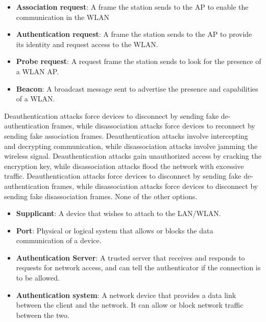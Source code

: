 \begin{solution}
    \begin{itemize}
        \item \textbf{Association request}: A frame the station sends to the AP to enable the communication in the WLAN
        \item \textbf{Authentication request}: A frame the station sends to the AP to provide its identity and request access to the WLAN.
        \item \textbf{Probe request}: A request frame the station sends to look for the presence of a WLAN AP.
        \item \textbf{Beacon}: A broadcast message sent to advertise the presence and capabilities of a WLAN.
    \end{itemize}
\end{solution}

\begin{checkboxes}
    \choice Deauthentication attacks force devices to disconnect by sending fake de-authentication frames, while disassociation attacks force devices to reconnect by sending fake association frames.
    \choice Deauthentication attacks involve intercepting and decrypting communication, while disassociation attacks involve jamming the wireless signal.
    \choice Deauthentication attacks gain unauthorized access by cracking the encryption key, while disassociation attacks flood the network with excessive traffic.
    \CorrectChoice Deauthentication attacks force devices to disconnect by sending fake de-authentication frames, while disassociation attacks force devices to disconnect by sending fake disassociation frames.
    \choice None of the other options.
\end{checkboxes}

\begin{solution}
    \begin{itemize}
        \item \textbf{Supplicant}: A device that wishes to attach to the LAN/WLAN.
        \item \textbf{Port}: Physical or logical system that allows or blocks the data communication of a device.
        \item \textbf{Authentication Server}: A trusted server that receives and responds to requests for network access, and can tell the authenticator if the connection is to be allowed.
        \item \textbf{Authentication system}: A network device that provides a data link between the client and the network. It can allow or block network traffic between the two.
    \end{itemize}
\end{solution}

